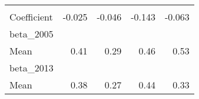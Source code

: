 \begin{tabular}{lllll}
  \multicolumn{1}{r}{} \\
\multicolumn{1}{l}{\hspace{1em}Coefficient} &
  \multicolumn{1}{|r}{-0.025} &
  \multicolumn{1}{r}{-0.046} &
  \multicolumn{1}{r}{-0.143} &
  \multicolumn{1}{r}{-0.063} \\
\multicolumn{1}{l}{beta\_2005} &
  \multicolumn{1}{|r}{} &
  \multicolumn{1}{r}{} &
  \multicolumn{1}{r}{} &
  \multicolumn{1}{r}{} \\
\multicolumn{1}{l}{\hspace{1em}Mean} &
  \multicolumn{1}{|r}{0.41} &
  \multicolumn{1}{r}{0.29} &
  \multicolumn{1}{r}{0.46} &
  \multicolumn{1}{r}{0.53} \\
\multicolumn{1}{l}{beta\_2013} &
  \multicolumn{1}{|r}{} &
  \multicolumn{1}{r}{} &
  \multicolumn{1}{r}{} &
  \multicolumn{1}{r}{} \\
\multicolumn{1}{l}{\hspace{1em}Mean} &
  \multicolumn{1}{|r}{0.38} &
  \multicolumn{1}{r}{0.27} &
  \multicolumn{1}{r}{0.44} &
  \multicolumn{1}{r}{0.33} \\
\cline{1-5}
\end{tabular}
